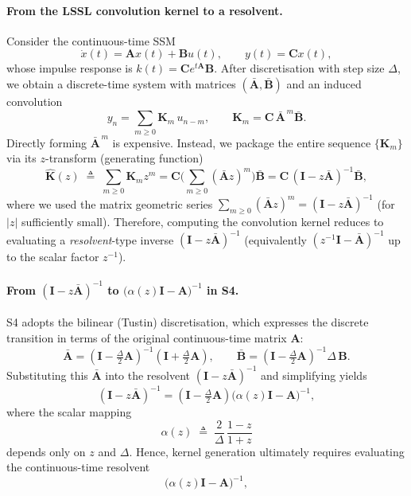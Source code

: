 \documentclass[a4paper,11pt]{article}
\begin{document}
\paragraph{From the LSSL convolution kernel to a resolvent.}
Consider the continuous-time SSM
\[
\dot{x}(t)=\mathbf{A}x(t)+\mathbf{B}u(t),\qquad y(t)=\mathbf{C}x(t),
\]
whose impulse response is $k(t)=\mathbf{C}e^{t\mathbf{A}}\mathbf{B}$. After discretisation with step size $\Delta$, we obtain a discrete-time system with matrices $(\bar{\mathbf{A}},\bar{\mathbf{B}})$ and an induced convolution
\[
y_n=\sum_{m\ge 0} \mathbf{K}_m\,u_{n-m},\qquad \mathbf{K}_m=\mathbf{C}\,\bar{\mathbf{A}}^{\,m}\bar{\mathbf{B}}.
\]
Directly forming $\bar{\mathbf{A}}^{\,m}$ is expensive. Instead, we package the entire sequence $\{\mathbf{K}_m\}$ via its $z$-transform (generating function)
\[
\hat{\mathbf{K}}(z)\;\triangleq\;\sum_{m\ge 0}\mathbf{K}_m z^m
= \mathbf{C}\Big(\sum_{m\ge 0}(\bar{\mathbf{A}}z)^m\Big)\bar{\mathbf{B}}
= \mathbf{C}\,(\mathbf{I}-z\bar{\mathbf{A}})^{-1}\bar{\mathbf{B}},
\]
where we used the matrix geometric series $\sum_{m\ge 0}(\bar{\mathbf{A}}z)^m=(\mathbf{I}-z\bar{\mathbf{A}})^{-1}$ (for $|z|$ sufficiently small).
Therefore, computing the convolution kernel reduces to evaluating a \emph{resolvent}-type inverse $(\mathbf{I}-z\bar{\mathbf{A}})^{-1}$ (equivalently $(z^{-1}\mathbf{I}-\bar{\mathbf{A}})^{-1}$ up to the scalar factor $z^{-1}$).

\paragraph{From $(\mathbf{I}-z\bar{\mathbf{A}})^{-1}$ to $\big(\alpha(z)\mathbf{I}-\mathbf{A}\big)^{-1}$ in S4.}
S4 adopts the bilinear (Tustin) discretisation, which expresses the discrete transition in terms of the original continuous-time matrix $\mathbf{A}$:
\[
\bar{\mathbf{A}}=(\mathbf{I}-\tfrac{\Delta}{2}\mathbf{A})^{-1}(\mathbf{I}+\tfrac{\Delta}{2}\mathbf{A}),\qquad
\bar{\mathbf{B}}=(\mathbf{I}-\tfrac{\Delta}{2}\mathbf{A})^{-1}\Delta\,\mathbf{B}.
\]
Substituting this $\bar{\mathbf{A}}$ into the resolvent $(\mathbf{I}-z\bar{\mathbf{A}})^{-1}$ and simplifying yields
\[
(\mathbf{I}-z\bar{\mathbf{A}})^{-1}
= (\mathbf{I}-\tfrac{\Delta}{2}\mathbf{A})\Big(\alpha(z)\mathbf{I}-\mathbf{A}\Big)^{-1},
\]
where the scalar mapping
\[
\alpha(z)\;\triangleq\;\frac{2}{\Delta}\,\frac{1-z}{1+z}
\]
depends only on $z$ and $\Delta$.
Hence, kernel generation ultimately requires evaluating the continuous-time resolvent
\begin{equation}\label{eq:resolvent}
\big(\alpha(z)\mathbf{I}-\mathbf{A}\big)^{-1},
\end{equation}
\end{document}

